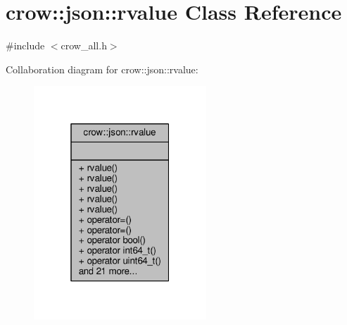 \hypertarget{classcrow_1_1json_1_1rvalue}{\section{crow\-:\-:json\-:\-:rvalue Class Reference}
\label{classcrow_1_1json_1_1rvalue}
}


{\ttfamily \#include $<$crow\-\_\-all.\-h$>$}



Collaboration diagram for crow\-:\-:json\-:\-:rvalue\-:
\nopagebreak
\begin{figure}[H]
\begin{center}
\leavevmode
\includegraphics[width=184pt]{classcrow_1_1json_1_1rvalue__coll__graph}
\end{center}
\end{figure}

